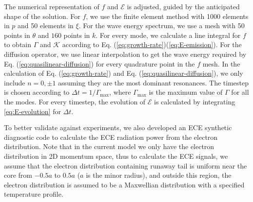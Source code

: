 \documentclass[aps, prl, preprint,english,superscriptaddress]{revtex4-1}
\begin{document}
The numerical representation of $f$ and $\mathcal{E}$ is adjusted, guided by the anticipated shape of the solution. For $f$, we use the finite element method with 1000 elements in $p$ and 50 elements in $\xi$.
For the wave energy spectrum, we use a mesh with 50 points in $\theta$ and $160$ points in $k$. For every mode, we calculate a line integral for $f$ to obtain $\Gamma$ and $\mathcal{K}$ according to Eq. (\ref{eq:growth-rate})(\ref{eq:E-emission}). For the diffusion operator, we use linear interpolation to get the wave energy required by Eq. (\ref{eq:quasilinear-diffusion}) for every quadrature point in the $f$ mesh. In the calculation of Eq. (\ref{eq:growth-rate}) and Eq. (\ref{eq:quasilinear-diffusion}), we only include $n=0, \pm 1$ assuming they are the most dominant resonances. The timestep is chosen according to $\Delta t=1/\Gamma_{\mathrm{max}}$, where $\Gamma_{\mathrm{max}}$ is the maximum  value of $\Gamma$ for all the modes. For every timestep, the evolution of $\mathcal{E}$ is calculated by integrating \ref{eq:E-evolution} for $\Delta t$. %

To better validate against experiments, we also developed an ECE synthetic diagnostic code to calculate the ECE radiation power from the electron distribution\cite{harvey_electron_1993,liu_runaway_2017}. Note that in the current model we only have the electron distribution in 2D momentum space, thus to calculate the ECE signals, we assume that the electron distribution containing runaway tail is uniform near the core from $-0.5a$ to $0.5a$ ($a$ is the minor radius), and outside this region, the electron distribution is assumed to be a Maxwellian distribution with a specified temperature profile.

\end{document}
